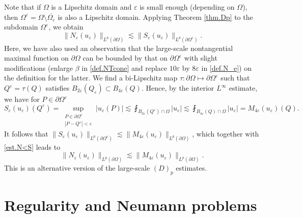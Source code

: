 \documentclass[reqno,12pt]{amsart} %
\theoremstyle{definition}
\theoremstyle{remark}
\newtheorem{remark}[theorem]{Remark}
\numberwithin{equation}{section}
\newcommand{\e}{\varepsilon}
\newcommand{\jz}[1]{\textcolor{red}{#1}}
\begin{document}
Note that if $\Omega$ is a Lipschitz domain and $\e$ is small enough (depending on $\Omega$), then $\Omega^\e= \Omega \setminus \overline{\Omega_\e}$ is also a Lipschitz domain.
 Applying Theorem \ref{thm.Dp} to the subdomain $\Omega^\e $, we obtain
\begin{equation}\label{est.N<S}
    \| N_\e(u_\e) \|_{L^p(\partial \Omega)} \lesssim \| S_\e(u_\e) \|_{L^p(\partial \Omega^\e)}.
\end{equation}
Here, we have also used an observation that the large-scale nontangential maximal function on $\partial \Omega$ can be bounded by that on $\partial \Omega^\e$ with slight modifications (enlarge $\beta$ in \eqref{def.NTcone} and replace $10\e$ by $8\e$ in \eqref{def.N_e}) on the definition for the latter.
We find a bi-Lipschitz map $\tau: \partial \Omega \mapsto \partial \Omega^\e$ such that $Q^\e = \tau(Q)$ satisfies $B_{2\e}(Q_\e) \subset B_{4\e}(Q)$.
Hence, by the interior $L^\infty$ estimate, we have for $P \in \partial \Omega^\e$
\begin{equation}
    S_\e(u_\e)(Q^\e) = \sup_{ \substack{P\in \partial \Omega^\e \\ |P-Q^\e|<\e }} |u_\e(P)|  \lesssim \fint_{B_{2\e}(Q^\e) \cap \Omega} |u_\e| \lesssim \fint_{B_{4\e}(Q) \cap \Omega} |u_\e| = M_{4\e}(u_\e)(Q).
\end{equation}
It follows that $\| S_\e(u_\e) \|_{L^p(\partial \Omega^\e)} \lesssim \| M_{4\e}(u_\e) \|_{L^p(\partial \Omega)}$, which together with \eqref{est.N<S} leads to
\begin{equation}\label{N-M}
    \| N_\e (u_\e)\|_{L^p(\partial\Omega)}
    \lesssim \| M_{4\e} (u_\e)\|_{L^p(\partial\Omega)}.
\end{equation}
This is an alternative version of the large-scale $(D)_p$ estimates.


\section{Regularity and Neumann problems}
\label{sec.RpNp}
\end{document}
